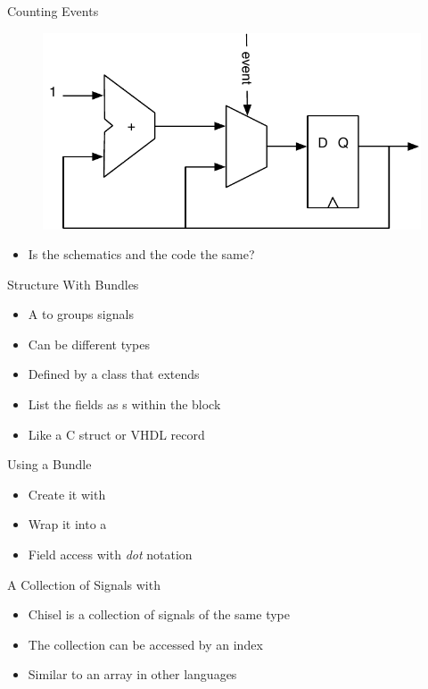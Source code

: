 \begin{frame}[fragile]{Counting Events}
\begin{figure}
  \includegraphics[scale=\scale]{../figures/event-counter}
\end{figure}
\begin{itemize}
\item Is the schematics and the code the same?
\end{itemize}
\end{frame}


\begin{frame}[fragile]{Structure With Bundles}
\begin{itemize}
\item A  to groups signals
\item Can be different types
\item Defined by a class that extends 
\item List the fields as s within the block
\item Like a C struct or VHDL record
\end{itemize}
\end{frame}

\begin{frame}[fragile]{Using a Bundle}
\begin{itemize}
\item Create it with 
\item Wrap it into a 
\item Field access with \emph{dot} notation
\end{itemize}
\end{frame}

\begin{frame}[fragile]{A Collection of Signals with }
\begin{itemize}
\item Chisel  is a collection of signals of the same type
\item The collection can be accessed by an index
\item Similar to an array in other languages
\end{itemize}
\end{frame}

